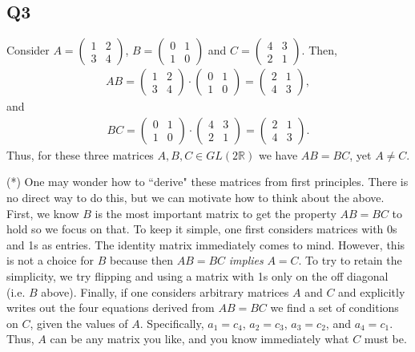 \documentclass[12pt]{article}
\def\R{{\mathbb R}}        %
\def\1{{\mathbf 1}}        %
\numberwithin{theorem}{section}
\numberwithin{equation}{section}
\numberwithin{remark}{section}
\numberwithin{definition}{section}
\numberwithin{theorem}{section}
\numberwithin{lemma}{section}
\numberwithin{example}{section}
\begin{document}
\subsection{Q3}

Consider $A = \begin{pmatrix}1 & 2 \\3 & 4\end{pmatrix}$, $B = \begin{pmatrix}0 & 1\\1 & 0\end{pmatrix}$ and $C = \begin{pmatrix}4 & 3 \\2 & 1\end{pmatrix}$. Then,
\begin{align*}
	AB = \begin{pmatrix}1 & 2 \\3 & 4\end{pmatrix} \cdot \begin{pmatrix}0 & 1\\1 & 0\end{pmatrix} = \begin{pmatrix}2 & 1\\4 & 3\end{pmatrix},
\end{align*}
and
\begin{align*}
	BC = \begin{pmatrix}0 & 1\\1 & 0\end{pmatrix} \cdot \begin{pmatrix}4 & 3 \\2 & 1\end{pmatrix}= \begin{pmatrix}2 & 1\\4 & 3\end{pmatrix}.
\end{align*}
Thus, for these three matrices $A,B,C\in GL(2\R)$ we have $AB=BC$, yet $A\neq C$. 

\vspace{\baselineskip}

\noindent (*) One may wonder how to ``derive" these matrices from first principles. There is no direct way to do this, but we can motivate how to think about the above. First, we know $B$ is the most important matrix to get the property $AB=BC$ to hold so we focus on that. To keep it simple, one first considers matrices with 0s and 1s as entries. The identity matrix immediately comes to mind. However, this is not a choice for $B$ because then $AB=BC$ \emph{implies} $A=C$. To try to retain the simplicity, we try flipping and using a matrix with 1s only on the off diagonal (i.e. $B$ above). Finally, if one considers arbitrary matrices $A$ and $C$ and explicitly writes out the four equations derived from $AB=BC$ we find a set of conditions on $C$, given the values of $A$. Specifically, $a_1=c_4$, $a_2=c_3$, $a_3=c_2$, and $a_4=c_1$.  Thus, $A$ can be any matrix you like, and you know immediately what $C$ must be. 
\end{document}

